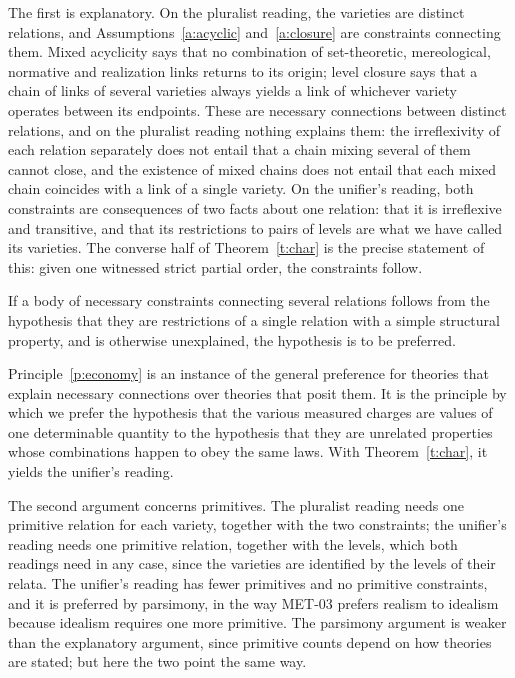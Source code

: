 \documentclass{situationist-preprint}
\begin{document}
The first is explanatory. On the pluralist reading, the varieties are distinct relations, and Assumptions~\ref{a:acyclic} and~\ref{a:closure} are constraints connecting them. Mixed acyclicity says that no combination of set-theoretic, mereological, normative and realization links returns to its origin; level closure says that a chain of links of several varieties always yields a link of whichever variety operates between its endpoints. These are necessary connections between distinct relations, and on the pluralist reading nothing explains them: the irreflexivity of each relation separately does not entail that a chain mixing several of them cannot close, and the existence of mixed chains does not entail that each mixed chain coincides with a link of a single variety. On the unifier's reading, both constraints are consequences of two facts about one relation: that it is irreflexive and transitive, and that its restrictions to pairs of levels are what we have called its varieties. The converse half of Theorem~\ref{t:char} is the precise statement of this: given one witnessed strict partial order, the constraints follow.

\begin{principle}\label{p:economy}
If a body of necessary constraints connecting several relations follows from the hypothesis that they are restrictions of a single relation with a simple structural property, and is otherwise unexplained, the hypothesis is to be preferred.
\end{principle}

Principle~\ref{p:economy} is an instance of the general preference for theories that explain necessary connections over theories that posit them. It is the principle by which we prefer the hypothesis that the various measured charges are values of one determinable quantity to the hypothesis that they are unrelated properties whose combinations happen to obey the same laws. With Theorem~\ref{t:char}, it yields the unifier's reading.

The second argument concerns primitives. The pluralist reading needs one primitive relation for each variety, together with the two constraints; the unifier's reading needs one primitive relation, together with the levels, which both readings need in any case, since the varieties are identified by the levels of their relata. The unifier's reading has fewer primitives and no primitive constraints, and it is preferred by parsimony, in the way MET-03 prefers realism to idealism because idealism requires one more primitive. The parsimony argument is weaker than the explanatory argument, since primitive counts depend on how theories are stated; but here the two point the same way.
\end{document}
